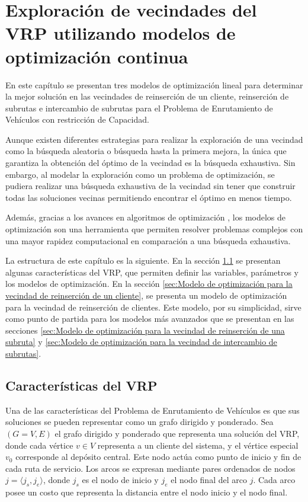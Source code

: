 \documentclass[12pt]{report}
\begin{document}
	\chapter{Exploración de vecindades del VRP utilizando modelos de optimización continua}
	\label{chap:Explorando vecindades del VRP utilizando modelos de optimización continua}

	En este capítulo se presentan tres modelos de optimización lineal para determinar la mejor solución en las vecindades de reinserción de un cliente, reinserción de subrutas e intercambio de subrutas para el Problema de Enrutamiento de Vehículos con restricción de Capacidad.

	Aunque existen diferentes estrategias para realizar la exploración de una vecindad como la búsqueda aleatoria o búsqueda hasta la primera mejora, la única que garantiza la obtención del óptimo de la vecindad es la búsqueda exhaustiva. Sin embargo, al modelar la exploración como un problema de optimización, se pudiera realizar una búsqueda exhaustiva de la vecindad sin tener que construir todas las soluciones vecinas permitiendo encontrar el óptimo en menos tiempo.

	Además, gracias a los avances en algoritmos de optimización \cite{ref24}, los modelos de optimización son una herramienta que permiten resolver problemas complejos con una mayor rapidez computacional en comparación a una búsqueda exhaustiva.


	La estructura de este capítulo es la siguiente. En la sección \ref{sec:Caracteristicas del VRP} se presentan algunas características del VRP, que permiten definir las variables, parámetros y los modelos de optimización. En la sección \ref{sec:Modelo de optimización para la vecindad de reinserción de un cliente}, se presenta un modelo de optimización para la vecindad de reinserción de clientes. Este modelo, por su simplicidad, sirve como punto de partida para los modelos más avanzados que se presentan en las secciones \ref{sec:Modelo de optimización para la vecindad de reinserción de una subruta} y \ref{sec:Modelo de optimización para la vecindad de intercambio de subrutas}.

	\section {Características del VRP}
	\label{sec:Caracteristicas del VRP}

	Una de las características del Problema de Enrutamiento de Vehículos es que sus soluciones se pueden representar como un grafo dirigido y ponderado.  Sea $(G=V,E)$ el grafo dirigido y ponderado que representa una solución del VRP, donde cada vértice $v \in V$ representa a un cliente del sistema, y el vértice especial $v_0$ corresponde al depósito central. Este nodo actúa como punto de inicio y fin de cada ruta de servicio. Los arcos se expresan mediante pares ordenados de nodos $j = \langle j_s, j_e \rangle$, donde $j_s$ es el nodo de inicio y $j_e$ el nodo final del arco $j$. Cada arco posee un costo que representa la distancia entre el nodo inicio y el nodo final.
\end{document}
